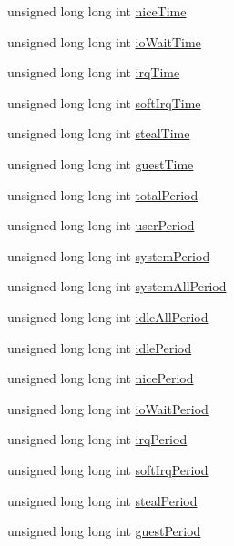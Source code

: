 \begin{DoxyCompactItemize}
\item 
unsigned long long int \hyperlink{structCPUData___a9df882269f31e3be78b4de49747bf98c}{nice\+Time}
\item 
unsigned long long int \hyperlink{structCPUData___a0e58f5f16df8ebf9f8422abe6b7adad0}{io\+Wait\+Time}
\item 
unsigned long long int \hyperlink{structCPUData___a7cc57b785d15fd68d3d0854f3fe3be1f}{irq\+Time}
\item 
unsigned long long int \hyperlink{structCPUData___a1a6783e9441f848763fc42d51e2eb51d}{soft\+Irq\+Time}
\item 
unsigned long long int \hyperlink{structCPUData___a9cf14f916a17bdd5fb27dc5cd4b09f5a}{steal\+Time}
\item 
unsigned long long int \hyperlink{structCPUData___ac6992d9c1a77b60d243bec285a98b808}{guest\+Time}
\item 
unsigned long long int \hyperlink{structCPUData___a1ea037763cc6639e7c45a2d70fd15ca4}{total\+Period}
\item 
unsigned long long int \hyperlink{structCPUData___a1c47011578cfe0f46b98d812996a2a92}{user\+Period}
\item 
unsigned long long int \hyperlink{structCPUData___a6724bd93ab893b2e6e6a9e54a35f8781}{system\+Period}
\item 
unsigned long long int \hyperlink{structCPUData___a896ddc4c8b6399cda283b5be72cd8088}{system\+All\+Period}
\item 
unsigned long long int \hyperlink{structCPUData___a9844f18c3027daaeb9057d5551c50204}{idle\+All\+Period}
\item 
unsigned long long int \hyperlink{structCPUData___ad9dadb2033d3bb445199930b77b4b28c}{idle\+Period}
\item 
unsigned long long int \hyperlink{structCPUData___a701107606d5d4efe85d99114700b06b4}{nice\+Period}
\item 
unsigned long long int \hyperlink{structCPUData___a01fdce37b515e3628222dbf2fd4ea0ba}{io\+Wait\+Period}
\item 
unsigned long long int \hyperlink{structCPUData___a56c88121828051d2f3b0e31ae2c53a7f}{irq\+Period}
\item 
unsigned long long int \hyperlink{structCPUData___aec56d04baa2469a5cba9d880b4e8f382}{soft\+Irq\+Period}
\item 
unsigned long long int \hyperlink{structCPUData___a34db4b0d097eed407fcbb128839eda1a}{steal\+Period}
\item 
unsigned long long int \hyperlink{structCPUData___a3ec4db287cf6f01570057523cbbe3beb}{guest\+Period}

\end{DoxyCompactItemize}
